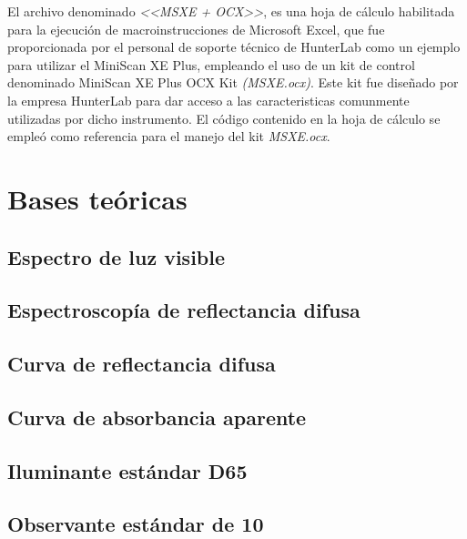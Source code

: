 			El archivo denominado \textit{<<MSXE + OCX>>}, es una hoja de c\'{a}lculo habilitada para la ejecuci\'{o}n de macroinstrucciones de Microsoft Excel, que fue proporcionada por el personal de soporte t\'{e}cnico de HunterLab como un ejemplo para utilizar el MiniScan XE Plus, empleando el uso de un kit de control denominado MiniScan XE Plus OCX Kit \textit{(MSXE.ocx)}. Este kit fue dise\~{n}ado por la empresa HunterLab para dar acceso a las caracteristicas comunmente utilizadas por dicho instrumento. El c\'{o}digo contenido en la hoja de c\'{a}lculo se emple\'{o} como referencia para el manejo del kit \textit{MSXE.ocx}.

	\section{Bases te\'{o}ricas}
	
	\subsection{Espectro de luz visible}
	
	\subsection{Espectroscop\'{i}a de reflectancia difusa}

	\subsection{Curva de reflectancia difusa}
	
	\subsection{Curva de absorbancia aparente}

	\subsection{Iluminante est\'{a}ndar D65}
	
	\subsection{Observante est\'{a}ndar de 10\degree}
	
